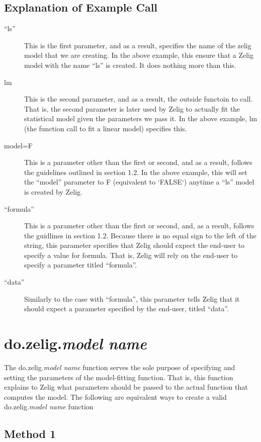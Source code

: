 \documentclass[a4paper, 11pt]{article}
\begin{document}
\subsection{Explanation of Example Call}
\begin{description}
	\item[``ls'']{This is the first parameter, and as a result, specifies the name of the zelig model that we are creating.  In the above example, this ensure that a Zelig model with the name ``ls'' is created.  It does nothing more than this.}
	\item[lm]{This is the second parameter, and as a result, the outside functoin to call.  That is, the second parameter is later used by Zelig to actually fit the statistical model given the parameters we pass it.  In the above example, lm (the function call to fit a linear model) specifies this.}
	\item[model=F]{This is a parameter other than the first or second, and as a result, follows the guidelines outlined in section 1.2.  In the above example, this will set the ``model'' parameter to F (equivalent to `FALSE`) anytime a ``ls'' model is created by Zelig.}
	\item[``formula'']{This is a parameter other than the first or second, and, as a result, follows the guidlines in section 1.2.  Because there is no equal sign to the left of the string, this parameter specifies that Zelig should expect the end-user to specify a value for formula.  That is, Zelig will rely on the end-user to specify a parameter titled ``formula''.}
	\item[``data'']{Similarly to the case with ``formula'', this parameter tells Zelig that it should expect a parameter specified by the end-user, titled ``data''.}
\end{description}

\section{do.zelig.\emph{model name}}

The do.zelig.\emph{model name} function serves the sole purpose of specifying and setting the parameters of the model-fitting function.  That is, this function explains to Zelig what parameters should be passed to the actual function that computes the model.  The following are equivalent ways to create a valid do.zelig.\emph{model name} function

\subsection*{Method 1}
\end{document}
